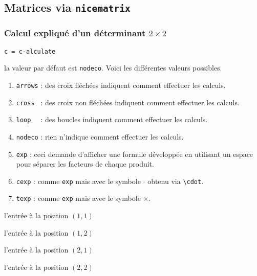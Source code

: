 \documentclass[12pt,a4paper]{article}
\theoremstyle{definition}
\newcommand\env[1]{\texttt{#1}}
\newcommand\macro[1]{\env{\textbackslash{}#1}}
\newcommand\extraspace{
    \vspace{0.25em}
}
\newcommand\mwhyprefix[2]{%
    \texttt{#1 = #1-#2}%
}
\begin{document}
\subsection{Matrices via \texttt{nicematrix}}

\subsubsection{\texorpdfstring{Calcul expliqué d'un déterminant $2 \times 2$}%
                           {Calcul expliqué d'un déterminant 2x2}} 



 \hfill \mwhyprefix{c}{alculate}

\IDoption{} la valeur par défaut est \verb+nodeco+. Voici les différentes valeurs possibles.
\begin{enumerate}
    \item \verb+arrows+ : des croix fléchées indiquent comment effectuer les calculs.

    \item \verb+cross + : des croix non fléchées indiquent comment effectuer les calculs.

    \item \verb+loop  + : des boucles indiquent comment effectuer les calculs.

    \item \verb+nodeco+ : rien n'indique comment effectuer les calculs.

    \medskip

    \item \verb+exp+ : ceci demande d'afficher une formule développée en utilisant un espace pour séparer les facteurs de chaque produit.

    \item \verb+cexp+ : comme \verb+exp+ mais avec le symbole $\cdot$ obtenu via \macro{cdot}.

    \item \verb+texp+ : comme \verb+exp+ mais avec le symbole $\times$.
\end{enumerate}

 l'entrée à la position $(1, 1)$

 l'entrée à la position $(1, 2)$

\extraspace

 l'entrée à la position $(2, 1)$

 l'entrée à la position $(2, 2)$                   
\end{document}
